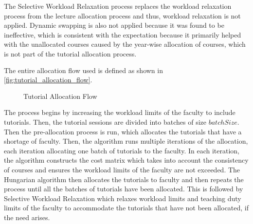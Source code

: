 The Selective Workload Relaxation process replaces the workload relaxation process from the lecture allocation process and thus, workload relaxation is not applied. Dynamic swapping is also not applied because it was found to be ineffective, which is consistent with the expectation because it primarily helped with the unallocated courses caused by the year-wise allocation of courses, which is not part of the tutorial allocation process.

The entire allocation flow used is defined as shown in \autoref{fig:tutorial_allocation_flow}.

\begin{figure}[H]
  \centering
  \caption{Tutorial Allocation Flow}
  \label{fig:tutorial_allocation_flow}
\end{figure}

The process begins by increasing the workload limits of the faculty to include tutorials. Then, the tutorial sessions are divided into batches of size $batchSize$. Then the pre-allocation process is run, which allocates the tutorials that have a shortage of faculty. Then, the algorithm runs multiple iterations of the allocation, each iteration allocating one batch of tutorials to the faculty. In each iteration, the algorithm constructs the cost matrix which takes into account the consistency of courses and ensures the workload limits of the faculty are not exceeded. The Hungarian algorithm then allocates the tutorials to faculty and then repeats the process until all the batches of tutorials have been allocated. This is followed by Selective Workload Relaxation which relaxes workload limits and teaching duty limits of the faculty to accommodate the tutorials that have not been allocated, if the need arises.

